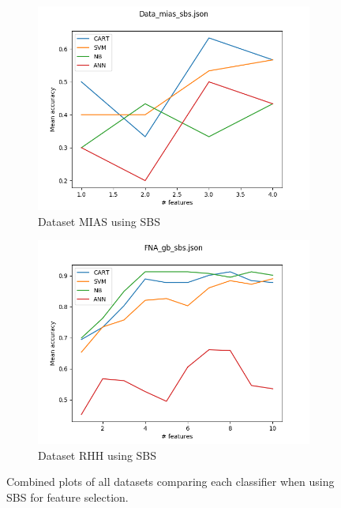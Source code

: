 \begin{figure}[htbp!]
  \begin{subfigure}[b]{0.475\textwidth}
      \centering
      \includegraphics[width=\textwidth]{../plots_1d/Data_mias_sb_combined.png}
      \caption[]%
      {{\small Dataset MIAS using SBS}}
      \label{fig:MIAS_sbs}
  \end{subfigure}
  \quad
  \begin{subfigure}[b]{0.475\textwidth}
      \centering
      \includegraphics[width=\textwidth]{../plots_1d/FNA_gb_sb_combined.png}
      \caption[]%
      {{\small Dataset RHH using SBS}}
      \label{fig:RHH_sbs}
  \end{subfigure}
  \caption[]
  {{\small Combined plots of all datasets comparing each classifier when using SBS for feature selection.}}
  \label{fig:plots_sbs}
\end{figure}

